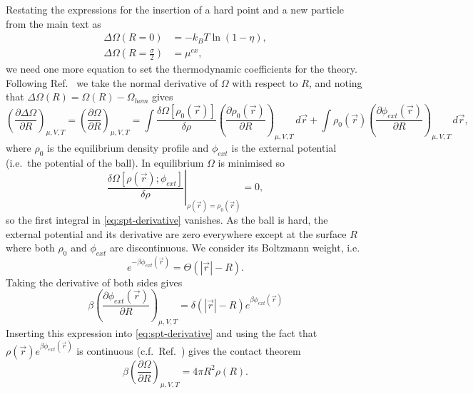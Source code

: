 \documentclass[12pt]{report}
\begin{document}
Restating the expressions for the insertion of a hard point and a new particle from the main text as
\begin{align}
  \label{eq:spt-point} \Delta\Omega(R=0) &= -k_B T \ln{(1- \eta)}, \\
  \label{eq:spt-mu} \Delta\Omega\left(R=\frac{\sigma}{2}\right) &= \mu^{ex},
\end{align}
we need one more equation to set the thermodynamic coefficients for the theory.
Following Ref.\ \cite{Bryk2003} we take the normal derivative of $\Omega$ with respect to $R$, and noting that $\Delta\Omega(R) = \Omega(R) - \Omega_{hom}$ gives
\begin{equation}\label{eq:spt-derivative}
  \left( \frac{\partial \Delta \Omega}{\partial R} \right)_{\mu,V,T} =
  \left( \frac{\partial \Omega}{\partial R} \right)_{\mu,V,T} =
  \int
  \frac{\delta \Omega[\rho_0(\vec{r})]}{\delta \rho}
  \left( \frac{\partial \rho_0(\vec{r})}{\partial R} \right)_{\mu,V,T}
  \, d\vec{r} +
  \int
  \rho_0(\vec{r})
  \left( \frac{\partial \phi_{ext}(\vec{r})}{\partial R} \right)_{\mu,V,T}
  \, d\vec{r},
\end{equation}
where $\rho_0$ is the equilibrium density profile and $\phi_{ext}$ is the external potential (i.e.\ the potential of the ball).
In equilibrium $\Omega$ is minimised so
\begin{equation}
  \left.
  \frac{\delta \Omega[\rho(\vec{r}); \phi_{ext}]}{\delta \rho}
  \right|_{\rho(\vec{r})=\rho_0(\vec{r})} = 0,
\end{equation}
so the first integral in \eqref{eq:spt-derivative} vanishes.
As the ball is hard, the external potential and its derivative are zero everywhere except at the surface $R$ where both $\rho_0$ and $\phi_{ext}$ are discontinuous.
We consider its Boltzmann weight, i.e.\
\begin{equation}
  e^{-\beta\phi_{ext}(\vec{r})} = \Theta(|\vec{r}| - R).
\end{equation}
Taking the derivative of both sides gives
\begin{equation}
  \beta\left( \frac{\partial\phi_{ext}(\vec{r})}{\partial R} \right)_{\mu,V,T} =
  \delta(|\vec{r}| - R) e^{\beta\phi_{ext}(\vec{r})}
\end{equation}
Inserting this expression into \eqref{eq:spt-derivative} and using the fact that $\rho(\vec{r}) e^{\beta\phi_{ext}(\vec{r})}$ is continuous (c.f.\ Ref.\ \cite{Hansen2013}) gives the contact theorem
\begin{equation}
  \beta \left( \frac{\partial \Omega}{\partial R} \right)_{\mu,V,T} =
  4\pi R^2 \rho(R).
\end{equation}
\end{document}
